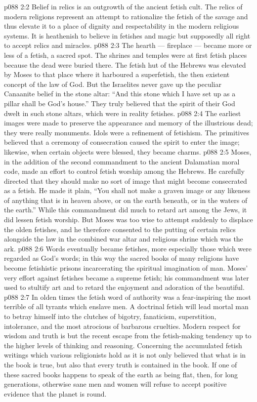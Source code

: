 \vs p088 2:2 Belief in relics is an outgrowth of the ancient fetish cult. The relics of modern religions represent an attempt to rationalize the fetish of the savage and thus elevate it to a place of dignity and respectability in the modern religious systems. It is heathenish to believe in fetishes and magic but supposedly all right to accept relics and miracles.
\vs p088 2:3 The hearth --- fireplace --- became more or less of a fetish, a sacred spot. The shrines and temples were at first fetish places because the dead were buried there. The fetish hut of the Hebrews was elevated by Moses to that place where it harboured a superfetish, the then existent concept of the law of God. But the Israelites never gave up the peculiar Canaanite belief in the stone altar: “And this stone which I have set up as a pillar shall be God’s house.” They truly believed that the spirit of their God dwelt in such stone altars, which were in reality fetishes.
\vs p088 2:4 \pc The earliest images were made to preserve the appearance and memory of the illustrious dead; they were really monuments. Idols were a refinement of fetishism. The primitives believed that a ceremony of consecration caused the spirit to enter the image; likewise, when certain objects were blessed, they became charms.
\vs p088 2:5 Moses, in the addition of the second commandment to the ancient Dalamatian moral code, made an effort to control fetish worship among the Hebrews. He carefully directed that they should make no sort of image that might become consecrated as a fetish. He made it plain, “You shall not make a graven image or any likeness of anything that is in heaven above, or on the earth beneath, or in the waters of the earth.” While this commandment did much to retard art among the Jews, it did lessen fetish worship. But Moses was too wise to attempt suddenly to displace the olden fetishes, and he therefore consented to the putting of certain relics alongside the law in the combined war altar and religious shrine which was the ark.
\vs p088 2:6 \pc Words eventually became fetishes, more especially those which were regarded as God’s words; in this way the sacred books of many religions have become fetishistic prisons incarcerating the spiritual imagination of man. Moses’ very effort against fetishes became a supreme fetish; his commandment was later used to stultify art and to retard the enjoyment and adoration of the beautiful.
\vs p088 2:7 In olden times the fetish word of authority was a fear\hyp{}inspiring  the most terrible of all tyrants which enslave men. A doctrinal fetish will lead mortal man to betray himself into the clutches of bigotry, fanaticism, superstition, intolerance, and the most atrocious of barbarous cruelties. Modern respect for wisdom and truth is but the recent escape from the fetish\hyp{}making tendency up to the higher levels of thinking and reasoning. Concerning the accumulated fetish writings which various religionists hold as  it is not only believed that what is in the book is true, but also that every truth is contained in the book. If one of these sacred books happens to speak of the earth as being flat, then, for long generations, otherwise sane men and women will refuse to accept positive evidence that the planet is round.
